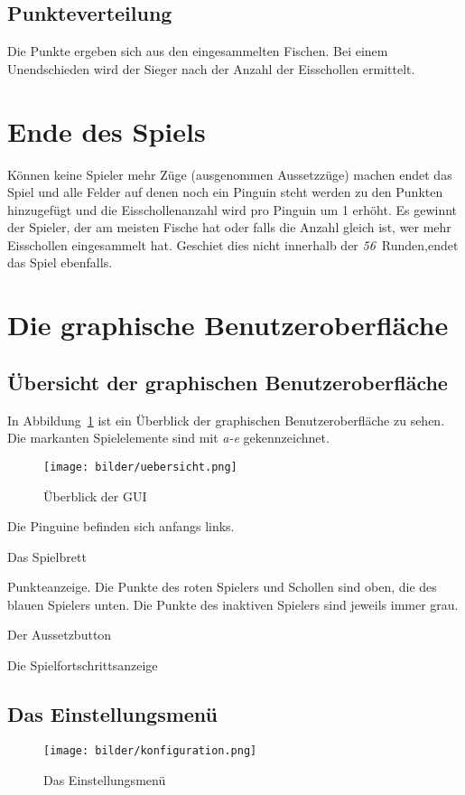 \documentclass[a4paper, ngerman]{scrartcl}
\newcommand{\RundenAnzahl}{\emph{56}}
\begin{document}
\subsection{Punkteverteilung}
Die Punkte ergeben sich aus den eingesammelten Fischen. Bei einem Unendschieden
wird der Sieger nach der Anzahl der Eisschollen ermittelt.

	
\section{Ende des Spiels} 
	Können keine Spieler mehr Züge (ausgenommen Aussetzzüge) machen endet das
	Spiel und alle Felder auf denen noch ein Pinguin steht werden zu den Punkten
	hinzugefügt und die Eisschollenanzahl wird pro Pinguin um 1 erhöht. Es
	gewinnt der Spieler, der am meisten Fische hat oder falls die Anzahl gleich ist,
	wer mehr Eisschollen eingesammelt hat.
	Geschiet dies nicht innerhalb der \RundenAnzahl\ Runden,endet das Spiel
	ebenfalls.
	
\section{Die graphische Benutzeroberfläche}
\subsection{Übersicht der graphischen Benutzeroberfläche}
	In Abbildung~\ref{fig:GUI} ist ein Überblick der graphischen Benutzeroberfläche
	zu sehen. Die markanten Spielelemente sind mit \emph{a-e} gekennzeichnet.
	
	 \begin{figure}[h!]
		\centering		
		\texttt{[image: bilder/uebersicht.png]} 
		\caption{Überblick der GUI}
		\label{fig:GUI}
	\end{figure} 
\begin{compactenum}[a)] \item Die Pinguine befinden sich anfangs links.
\item Das Spielbrett \item Punkteanzeige.
 Die Punkte des roten Spielers und Schollen sind 
oben, die des blauen Spielers unten. Die Punkte des inaktiven Spielers sind
jeweils immer grau.
\item Der Aussetzbutton
\item  Die Spielfortschrittsanzeige
	\end{compactenum}
	
\subsection{Das Einstellungsmenü} 
	 \begin{figure}[h!]
		\centering
		\texttt{[image: bilder/konfiguration.png]}
		\caption{Das Einstellungsmenü}
		\label{fig:Configuration}
	\end{figure}
	
\end{document}

